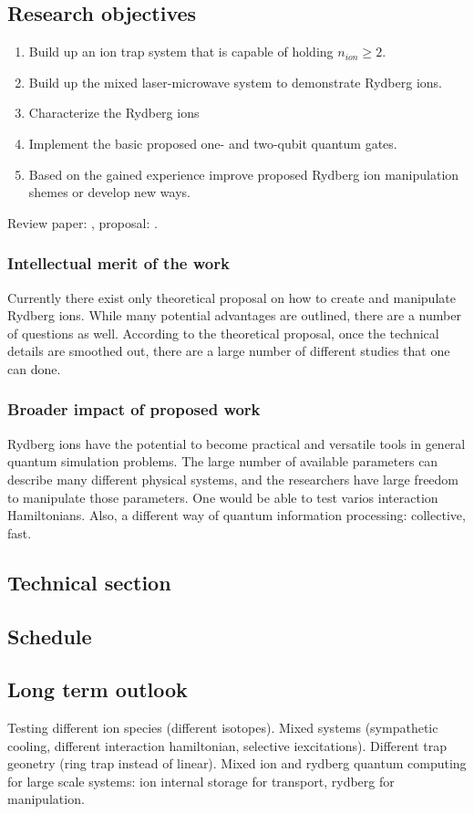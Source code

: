 \subsection{Research objectives}

\begin{enumerate}
 \item Build up an ion trap system that is capable of holding $n_{ion} \ge 2$.
 \item Build up the mixed laser-microwave system to demonstrate Rydberg ions.
 \item Characterize the Rydberg ions
 \item Implement the basic proposed one- and two-qubit quantum gates.
 \item Based on the gained experience improve proposed Rydberg ion manipulation shemes or develop new ways.
\end{enumerate}

Review paper: \cite{Saffman2010}, proposal: \cite{Mueller2008}.

\subsubsection{Intellectual merit of the work}

Currently there exist only theoretical proposal on how to create and manipulate Rydberg ions. While many potential advantages are outlined, there are a number of questions as well. According to the theoretical proposal, once the technical details are smoothed out, there are a large number of different studies that one can done.

\subsubsection{Broader impact of proposed work}

Rydberg ions have the potential to become practical and versatile tools in general quantum simulation problems. The large number of available parameters can describe many different physical systems, and the researchers have large freedom to manipulate those parameters. One would be able to test varios interaction Hamiltonians. Also, a different way of quantum information processing: collective, fast.

\subsection{Technical section}

\subsection{Schedule}

\subsection{Long term outlook}

Testing different ion species (different isotopes). Mixed systems (sympathetic cooling, different interaction hamiltonian, selective iexcitations). Different trap geonetry (ring trap instead of linear). Mixed ion and rydberg quantum computing for large scale systems: ion internal storage for transport, rydberg for manipulation.
